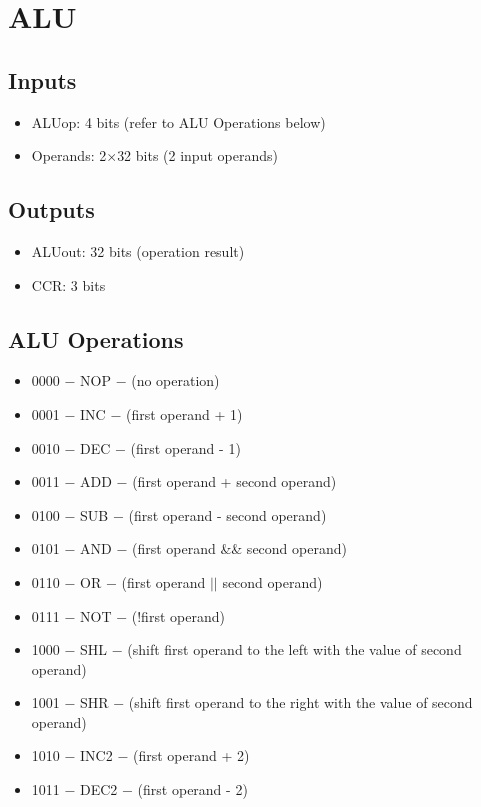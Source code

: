 \section{ALU}

\subsection{Inputs}
\begin{itemize}
    \item ALUop: 4 bits (refer to ALU Operations below)
    \item Operands: 2$\times$32 bits (2 input operands)
\end{itemize}

\subsection{Outputs}
\begin{itemize}
    \item ALUout: 32 bits (operation result)
    \item CCR: 3 bits
\end{itemize}

\subsection{ALU Operations}
\begin{itemize}
    \item 0000 $-$ NOP $-$ (no operation)
    \item 0001 $-$ INC $-$ (first operand + 1)
    \item 0010 $-$ DEC $-$ (first operand - 1)
    \item 0011 $-$ ADD $-$ (first operand + second operand)
    \item 0100 $-$ SUB $-$ (first operand - second operand)
    \item 0101 $-$ AND $-$ (first operand \&\& second operand)
    \item 0110 $-$ OR $-$ (first operand $||$ second operand)
    \item 0111 $-$ NOT $-$ (!first operand)
    \item 1000 $-$ SHL $-$ (shift first operand to the left with the value of second operand)
    \item 1001 $-$ SHR $-$ (shift first operand to the right with the value of second operand)
    \item 1010 $-$ INC2 $-$ (first operand + 2)
    \item 1011 $-$ DEC2 $-$ (first operand - 2)
\end{itemize}

